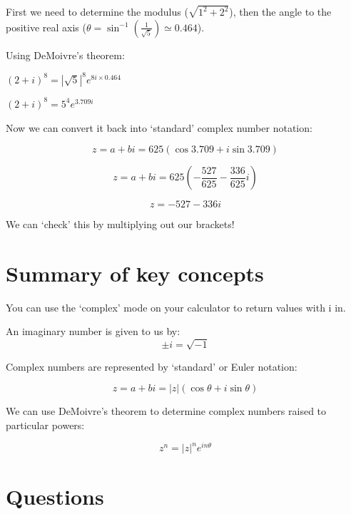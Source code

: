 \documentclass[
]{book}
\begin{document}
First we need to determine the modulus (\(\sqrt{1^2+2^2}\)), then the angle to the positive real axis (\(\theta = \sin^{-1} \left(\frac{1}{\sqrt{5}}\right) \simeq 0.464\)).

Using DeMoivre's theorem:

\((2+ i)^8 = |\sqrt{5}|^8e^{8i\times 0.464}\)

\((2+ i)^8 = 5^4e^{3.709i}\)

Now we can convert it back into `standard' complex number notation:

\begin{equation*}
z = a+bi = 625 (\cos 3.709 + i \sin 3.709)
\end{equation*}

\begin{equation*}
z = a+bi = 625 (-\frac{527}{625} - \frac{336}{625}i)
\end{equation*}

\begin{equation*}
z = -527-336i
\end{equation*}

We can `check' this by multiplying out our brackets!

\hypertarget{sec:Summary7}{%
\section{Summary of key concepts}\label{sec:Summary7}}

You can use the `complex' mode on your calculator to return values with i in.

An imaginary number is given to us by:
\begin{equation*}
\pm i = \sqrt{-1}
\end{equation*}

Complex numbers are represented by `standard' or Euler notation:

\begin{equation*}
z=a+bi=|z| (\cos \theta + i \sin \theta)
\end{equation*}

We can use DeMoivre's theorem to determine complex numbers raised to particular powers:

\begin{equation*}
z^n = |z|^n e^{in\theta}
\end{equation*}

\hypertarget{sec:questions7}{%
\section{Questions}\label{sec:questions7}}
\end{document}
